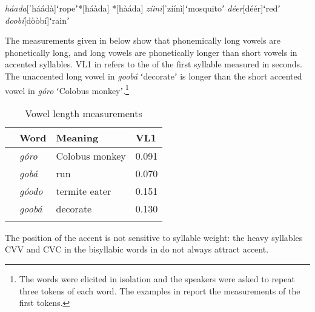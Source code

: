 \documentclass[output=paper,modfonts,nonflat,hidelinks]{langsci/langscibook}
\begin{document}
\begin{exe}
	\ex \begin{xlist}
	\ex \textit{háada}\hspace{7mm}[ˈháádà]\hspace{4mm}ʻropeʼ\hspace{10mm}*[háàda] *[hàáda]
    \ex \textit{zíini}\hspace{10mm}[ˈzíínì]\hspace{6mm}ʻmosquitoʼ\hspace{3mm}
    \ex \textit{déer}\hspace{11mm}[déér]\hspace{7mm}ʻredʼ\hspace{12mm}
	\ex \textit{doobí}\hspace{9mm}[dòòbí]\hspace{5mm}ʻrainʼ\hspace{12mm}
    \end{xlist} \label{ex:Petrollino:nocontour}
\end{exe}

The measurements given in  below show that phonemically long vowels are phonetically long, and long vowels are phonetically longer than short vowels in accented syllables. VL1 in  refers to the  of the first syllable measured in seconds. The unaccented long vowel in \textit{goobá} ʻdecorateʼ is longer than the short accented vowel in \textit{góro} ʻColobus monkeyʼ.\footnote{The words were  elicited in isolation and the speakers were asked to repeat three tokens of each word. The examples in  report the measurements of the first tokens.}

\begin{table}
\caption{Vowel length measurements}
\label{tab:Petrollino:3}
 \begin{tabular}{llll}
  \lsptoprule
    & Word & Meaning & VL1\\
  \midrule
    &   \textit{góro} & Colobus monkey &  0.091\\
    &   \textit{gobá} & run & 0.070 \\
    &   \textit{góodo} & termite eater & 0.151\\
    &	\textit{goobá} & decorate & 0.130\\
  \lspbottomrule
 \end{tabular}
\end{table}

The position of the accent is not sensitive to syllable weight: the heavy syllables CVV and CVC in the bisyllabic words in  do not always attract accent.
\end{document}

